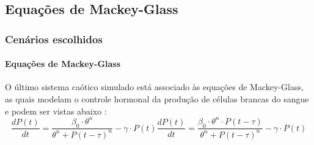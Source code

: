 \documentclass[aspectratio=169]{beamer}
\begin{document}
\subsection{Equações de Mackey-Glass}
\begin{frame}
	\frametitle{Cenários escolhidos}
	\framesubtitle{Equações de Mackey-Glass}
	\justifying O último sistema caótico simulado está associado às equações de Mackey-Glass, as quais modelam o controle hormonal da produção de células brancas do sangue e podem ser vistas abaixo \cite{mackey1977oscillation}:
\begin{subequations}
\begin{equation}
\frac{dP(t)}{dt} = \frac{\beta_0\cdot \theta^n}{\theta^n + P(t - \tau)^n} - \gamma\cdot P(t)
\end{equation}
\begin{equation}\label{eq:mackey-glass-chaos}
\frac{dP(t)}{dt} = \frac{\beta_0\cdot \theta^n \cdot P(t - \tau)}{\theta^n + P(t - \tau)^n} - \gamma\cdot P(t)
\end{equation}
\end{subequations}
\end{frame}
\end{document}
